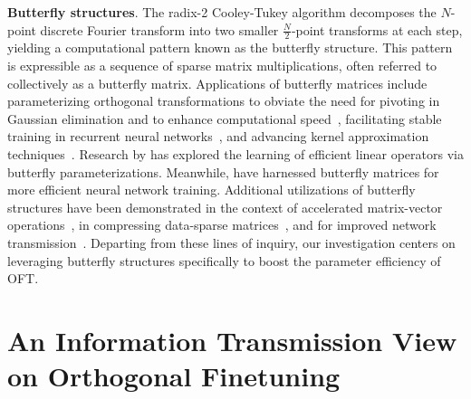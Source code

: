 \textbf{Butterfly structures}. The radix-2 Cooley-Tukey algorithm decomposes the $N$-point discrete Fourier transform into two smaller $\frac{N}{2}$-point transforms at each step, yielding a computational pattern known as the butterfly structure. This pattern is expressible as a sequence of sparse matrix multiplications, often referred to collectively as a butterfly matrix. Applications of butterfly matrices include parameterizing orthogonal transformations to obviate the need for pivoting in Gaussian elimination and to enhance computational speed~\cite{parker1995random}, facilitating stable training in recurrent neural networks~\cite{jing2017tunable}, and advancing kernel approximation techniques~\cite{munkhoeva2018quadrature}. Research by \cite{dao2019learning,dao2019kaleidoscope} has explored the learning of efficient linear operators via butterfly parameterizations. Meanwhile, \cite{chen2022pixelated,dao2022monarch} have harnessed butterfly matrices for more efficient neural network training. Additional utilizations of butterfly structures have been demonstrated in the context of accelerated matrix-vector operations~\cite{michielssen1996multilevel,o2010algorithm}, in compressing data-sparse matrices~\cite{li2015butterfly}, and for improved network transmission~\cite{klasing1994broadcasting,li2003linear,rajasingh2016transmission}. Departing from these lines of inquiry, our investigation centers on leveraging butterfly structures specifically to boost the parameter efficiency of OFT.

\section{An Information Transmission View on Orthogonal Finetuning}

